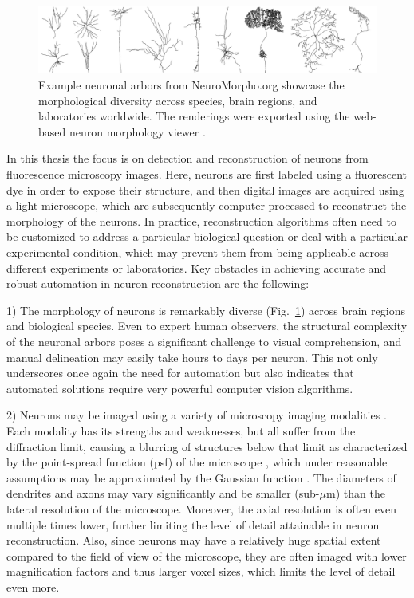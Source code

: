 \begin{figure}[t!]
	\begin{center}
		\includegraphics[width=\textwidth]{fig2}
	\end{center}
	\caption{Example neuronal arbors from NeuroMorpho.org showcase the morphological diversity across species, brain regions, and laboratories worldwide. The renderings were  exported using the web-based neuron morphology viewer \cite{bakker2016web}.}
	\label{ch1:fig2}
\end{figure}

In this thesis the focus is on detection and reconstruction of neurons from fluorescence microscopy images. Here, neurons are first labeled using a fluorescent dye in order to expose their structure, and then digital images are acquired using a light microscope, which are subsequently computer processed to reconstruct the morphology of the neurons. In practice, reconstruction algorithms often need to be customized to address a particular biological question or deal with a particular experimental condition, which may prevent them from being applicable across different experiments or laboratories. Key obstacles in achieving accurate and robust automation in neuron reconstruction \cite{meijering2010neuron, donohue2011automated, acciai2016automated} are the following:

1) The morphology of neurons is remarkably diverse (Fig.~\ref{ch1:fig2}) across brain regions and biological species. Even to expert human observers, the structural complexity of the neuronal arbors poses a significant challenge to visual comprehension, and manual delineation may easily take hours to days per neuron. This not only underscores once again the need for automation but also indicates that automated solutions require very powerful computer vision algorithms.

2) Neurons may be imaged using a variety of microscopy imaging modalities \cite{meijering2010neuron, donohue2011automated}. Each modality has its strengths and weaknesses, but all suffer from the diffraction limit, causing a blurring of structures below that limit as characterized by the point-spread function (\gls{psf}) of the microscope \cite{cox2012optical}, which under reasonable assumptions may be approximated by the Gaussian function \cite{zhang2007gaussian}. The diameters of dendrites and axons may vary significantly and be smaller (sub-$\mu$m) than the lateral resolution of the microscope. Moreover, the axial resolution is often even multiple times lower, further limiting the level of detail attainable in neuron reconstruction. Also, since neurons may have a relatively huge spatial extent compared to the field of view of the microscope, they are often imaged with lower magnification factors and thus larger voxel sizes, which limits the level of detail even more.

